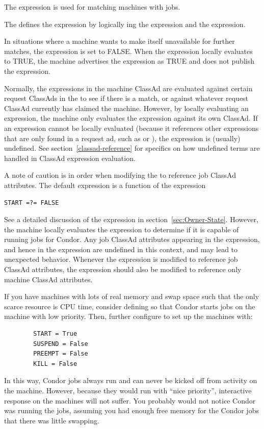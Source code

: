 The  expression is used for
matching machines with jobs.

The  defines the
 expression by logically ing the 
 expression and the 
expression. 

In situations where a machine wants to make itself
unavailable for further matches, the 
expression is set to FALSE.  
When the  expression locally evaluates to TRUE, the
machine advertises the  expression as TRUE and
does not publish the  expression.

Normally, the expressions in the machine ClassAd are evaluated against
certain request ClassAds in the  to see if there is
a match, or against whatever request ClassAd currently has claimed the
machine.  However, by locally evaluating an expression, the machine only
evaluates the expression against its own ClassAd.  If an expression
cannot be locally evaluated (because it references other expressions
that are only found in a request ad, such as  or
), the expression is (usually) undefined.
See section~\ref{classad-reference} for specifics on
how undefined terms are handled in ClassAd expression evaluation. 

A note of caution is in order when modifying the  to
reference job ClassAd attributes.  The default 
expression is a function of the  expression
\begin{verbatim}
START =?= FALSE
\end{verbatim}
See a detailed discussion of the  expression in
section~\ref{sec:Owner-State}.  However, the machine locally
evaluates the  expression to determine if it is
capable of running jobs for Condor.  Any job ClassAd attributes
appearing in the  expression, and hence in the
 expression are undefined in this context, and may
lead to unexpected behavior.  Whenever the  expression
is modified to reference job ClassAd attributes, the
 expression should also be modified to reference
only machine ClassAd attributes.

\Note If you have machines with lots of real memory and swap space such
that the only scarce resource is CPU time, consider
defining  
so that Condor starts jobs on the machine with low priority.
Then, further configure to set up the machines with:
\begin{verbatim}
        START = True
        SUSPEND = False
        PREEMPT = False
        KILL = False
\end{verbatim}
In this way, Condor jobs always run and can never be kicked off
from activity on the machine. 
However, because they would run with ``nice priority'', interactive 
response on the machines will not suffer.
You probably would not notice Condor was running the jobs, 
assuming you had enough free memory for the Condor jobs that there
was little swapping.


